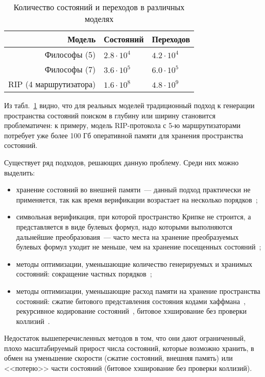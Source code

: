 \documentclass[a4paper,notitlepage,14pt]{article}
\begin{document}
\begin{table}
  \centering
  \begin{tabular}{|r|l|l|}
    \hline
    Модель                  & Состояний         & Переходов       \\
    \hline
    Философы (5)            & $2.8 \cdot 10^4$  & $4.2 \cdot 10^4$ \\
    Философы (7)            & $3.6 \cdot 10^5$  & $6.0 \cdot 10^5$ \\
    RIP (4 маршрутизатора)  & $1.6 \cdot 10^8$  & $4.8 \cdot 10^9$ \\
    \hline
  \end{tabular}
  \caption{Количество состояний и переходов в различных моделях}
\label{tab:models-statecount}
\end{table}

Из табл.~\ref{tab:models-statecount} видно, что для реальных моделей традиционный подход к
генерации пространства состояний поиском в глубину или ширину становится проблематичен: к
примеру, модель RIP-протокола с 5-ю маршрутизаторами потребует уже более 100 Гб
оперативной памяти для хранения пространства состояний.

Существует ряд подходов, решающих данную проблему. Среди них можно выделить:

\begin{itemize}
\item хранение состояний во внешней памяти~--- данный подход практически не применяется,
  так как время верификации возрастает на несколько порядков~\cite{Clarke};
\item символьная верификация, при которой пространство Крипке не строится, а
  представляется в виде булевых формул, надо которыми выполняются дальнейшие
  преобразоваия~--- часто места на хранение преобразуемых булевых формул уходит не меньше,
  чем на хранение посещенных состояний~\cite{Stern97parallelizingthe};
\item методы оптимизации, уменьшающие количество генерируемых и хранимых состояний:
  сокращение частных порядков~\cite{POD};
\item методы оптимизации, уменьшающие расход памяти на хранение пространства состояний:
  сжатие битового представления состояния кодами хаффмана~\cite{StateCompr}, рекурсивное
  кодирование состояний~\cite{StateCompr}, битовое хэширование без проверки
  коллизий~\cite{BitHash1,Wolper}.
\end{itemize}

Недостаток вышеперечисленных методов в том, что они дают ограниченный, плохо
масштабируемый прирост числа состояний, которые возможно хранить, в обмен на уменьшение
скорости (сжатие состояний, внешняя память) или <<потерю>> части состояний (битовое
хэширование без проверки коллизий).
\end{document}
